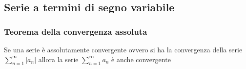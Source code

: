 \documentclass[10pt,a4paper]{report}
\begin{document}
            \subsection*{Serie a termini di segno variabile}
                
                \subsubsection{Teorema della convergenza assoluta}
                Se una serie è assolutamente convergente ovvero si ha la convergenza della serie $ \sum_{n=1}^{\infty} |a_{n}| $ allora la serie $ \sum_{n=1}^{\infty} a_{n} $ è anche convergente
\end{document}
